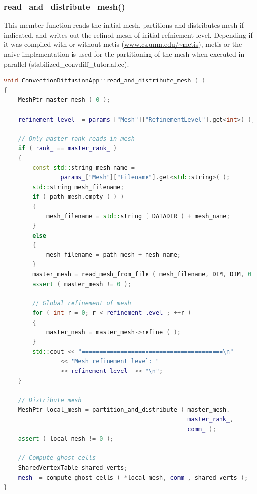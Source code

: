\documentclass[a4paper, 11pt, twoside]{article}
\begin{document}
\subsubsection{read\_and\_distribute\_mesh()}\label{read-mesh}
This member function reads the initial mesh, partitions and distributes mesh if indicated, and writes out the refined mesh of initial refniement level. Depending if it was compiled with or without metis (\url{www.cs.umn.edu/~metis}), metis or the naive implementation is used for the partitioning of the mesh when executed in parallel (stabilized\_convdiff\_tutorial.cc).
\begin{lstlisting}[language=C++, basicstyle={\footnotesize, \ttfamily}, keywordstyle=\color{blue}, numbers=none, tabsize=4]
void ConvectionDiffusionApp::read_and_distribute_mesh ( )
{
    MeshPtr master_mesh ( 0 );

    refinement_level_ = params_["Mesh"]["RefinementLevel"].get<int>( );

    // Only master rank reads in mesh
    if ( rank_ == master_rank_ )
    {
        const std::string mesh_name =
                params_["Mesh"]["Filename"].get<std::string>( );
        std::string mesh_filename;
        if ( path_mesh.empty ( ) )
        {
            mesh_filename = std::string ( DATADIR ) + mesh_name;
        }
        else
        {
            mesh_filename = path_mesh + mesh_name;
        }
        master_mesh = read_mesh_from_file ( mesh_filename, DIM, DIM, 0 );
        assert ( master_mesh != 0 );

        // Global refinement of mesh
        for ( int r = 0; r < refinement_level_; ++r )
        {
            master_mesh = master_mesh->refine ( );
        }
        std::cout << "========================================\n"
                << "Mesh refinement level: "
                << refinement_level_ << "\n";
    }

    // Distribute mesh
    MeshPtr local_mesh = partition_and_distribute ( master_mesh, 
                                                    master_rank_,
                                                    comm_ );
    assert ( local_mesh != 0 );

    // Compute ghost cells
    SharedVertexTable shared_verts;
    mesh_ = compute_ghost_cells ( *local_mesh, comm_, shared_verts );
}
\end{lstlisting}
\end{document}
